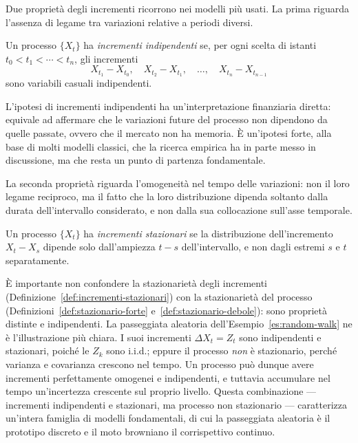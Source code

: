 Due propriet\`{a} degli incrementi ricorrono nei modelli pi\`{u}
usati. La prima riguarda l'assenza di legame tra variazioni relative
a periodi diversi.

\begin{definition}
\label{def:incrementi-indip}
Un processo $\{X_t\}$ ha \emph{incrementi indipendenti} se, per ogni
scelta di istanti $t_0<t_1<\cdots<t_n$, gli incrementi
\[
X_{t_1}-X_{t_0},\quad X_{t_2}-X_{t_1},\quad\ldots,\quad
X_{t_n}-X_{t_{n-1}}
\]
sono variabili casuali indipendenti.
\end{definition}

L'ipotesi di incrementi indipendenti ha un'interpretazione finanziaria
diretta: equivale ad affermare che le variazioni future del processo
non dipendono da quelle passate, ovvero che il mercato non ha memoria.
\`{E} un'ipotesi forte, alla base di molti modelli classici, che la
ricerca empirica ha in parte messo in discussione, ma che resta un
punto di partenza fondamentale.

La seconda propriet\`{a} riguarda l'omogeneit\`{a} nel tempo delle
variazioni: non il loro legame reciproco, ma il fatto che la loro
distribuzione dipenda soltanto dalla durata dell'intervallo
considerato, e non dalla sua collocazione sull'asse temporale.

\begin{definition}
\label{def:incrementi-stazionari}
Un processo $\{X_t\}$ ha \emph{incrementi stazionari} se la
distribuzione dell'incremento $X_t-X_s$ dipende solo dall'ampiezza
$t-s$ dell'intervallo, e non dagli estremi $s$ e $t$ separatamente.
\end{definition}

\`{E} importante non confondere la stazionariet\`{a} degli incrementi
(Definizione~\ref{def:incrementi-stazionari}) con la stazionariet\`{a}
del processo (Definizioni~\ref{def:stazionario-forte}
e~\ref{def:stazionario-debole}): sono propriet\`{a} distinte e
indipendenti. La passeggiata aleatoria dell'Esempio~\ref{es:random-walk}
ne \`{e} l'illustrazione pi\`{u} chiara. I suoi incrementi $\Delta
X_t=Z_t$ sono indipendenti e stazionari, poich\'{e} le $Z_k$ sono
i.i.d.; eppure il processo \emph{non} \`{e} stazionario, perch\'{e}
varianza e covarianza crescono nel tempo. Un processo pu\`{o} dunque
avere incrementi perfettamente omogenei e indipendenti, e tuttavia
accumulare nel tempo un'incertezza crescente sul proprio livello.
Questa combinazione --- incrementi indipendenti e stazionari, ma
processo non stazionario --- caratterizza un'intera famiglia di
modelli fondamentali, di cui la passeggiata aleatoria \`{e} il
prototipo discreto e il moto browniano il corrispettivo continuo.

